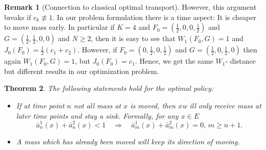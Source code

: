 \documentclass[reqno, 12pt]{amsart}%
\newtheorem{theorem}{Theorem}
\theoremstyle{definition}
\newtheorem{remark}[theorem]{Remark}
\numberwithin{equation}{section} \numberwithin{theorem}{section}
\begin{document}
\begin{remark}[Connection to classical optimal transport]
However, this argument breaks if  $c_k\not\equiv 1$. In our problem formulation there is a time aspect: It is cheaper to move 
 mass early. In particular if $K=4$ and 
 $F_0=(\frac12,0,0,\frac12)$ and $G=(\frac12,
\frac12,0,0)$ and $N\ge 2$, then it is easy 
to see that $W_1(F_0,G)=1$ and $J_0(F_0)= 
\frac12(c_1+c_2)$. However, if   $F_0=(0,
\frac12,0,\frac12)$ and $G=(\frac12,0,
\frac12,0)$  then  again $W_1(F_0,G)=1$, but 
$J_0(F_0)= c_1$. Hence, we get the same $W_1$-
distance but different results in our 
optimization problem.
\end{remark}

\begin{theorem}\label{theo:OT}
The following statements hold  for the optimal policy:
\begin{itemize}
\item[a)] If at time point $n$  not all mass 
at $x$ is moved, then $x$w ill only receive 
mass at later time points and stay a sink.
Formally, for any $x\in E$  
$$ \bar a_n^1(x)+\bar a_n^2(x)< 1 \quad \Rightarrow\quad \bar a_m^1(x)+\bar a_m^2(x)=0,\, m\ge  n+1. $$
\item[b)]  A mass which has already been moved 
will keep its direction of moving.
    \end{itemize}
\end{theorem}
\end{document}
